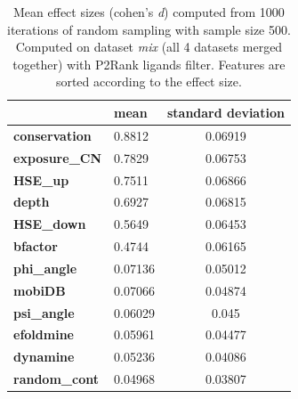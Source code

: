 \begin{table}[!htbp]
\centering
\begin{tabular}{@{}llc@{}}
\toprule
                      & \textbf{mean} & \textbf{standard deviation} \\ \midrule
\textbf{conservation} & 0.8812        & 0.06919           \\
\textbf{exposure\_CN} & 0.7829        & 0.06753           \\
\textbf{HSE\_up}      & 0.7511        & 0.06866           \\
\textbf{depth}        & 0.6927        & 0.06815           \\
\textbf{HSE\_down}    & 0.5649        & 0.06453           \\
\textbf{bfactor}      & 0.4744        & 0.06165           \\
\textbf{phi\_angle}   & 0.07136       & 0.05012           \\
\textbf{mobiDB}       & 0.07066       & 0.04874           \\
\textbf{psi\_angle}   & 0.06029       & 0.045             \\
\textbf{efoldmine}    & 0.05961       & 0.04477           \\
\textbf{dynamine}     & 0.05236       & 0.04086           \\
\textbf{random\_cont} & 0.04968       & 0.03807           \\ \bottomrule
\end{tabular}
\caption{Mean effect sizes (cohen's \textit{d}) computed from 1000 iterations of random sampling with sample size 500. Computed on dataset \textit{mix} (all 4 datasets merged together) with P2Rank ligands filter. Features are sorted according to the effect size.}
\label{tab:cohensd500}
\end{table}

